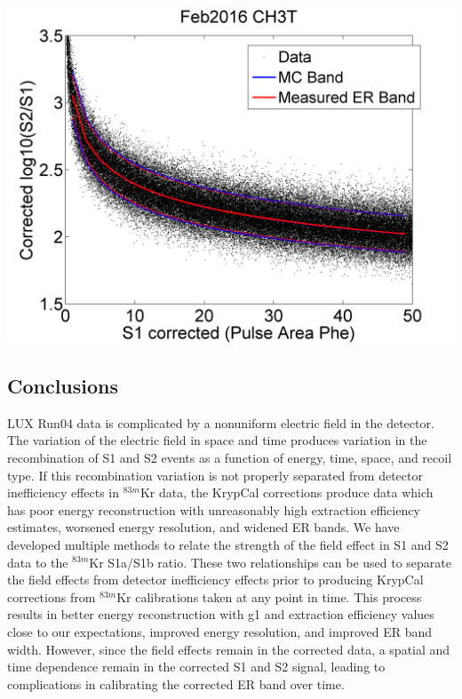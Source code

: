 \documentclass[a4paper,12pt]{article}
\begin{document}
{\begin{center}
\includegraphics[scale=0.45]{Run04Corrections/Feb2016_ERPrediction.png}
 \label{Feb2016ERPred}
\end{center}

\subsection{Conclusions}

LUX Run04 data is complicated by a nonuniform electric field in the detector.  The variation of the electric field in space and time produces variation in the recombination of S1 and S2 events as a function of energy, time, space, and recoil type.  If this recombination variation is not properly separated from detector inefficiency effects in $^{83m}$Kr data, the KrypCal corrections produce data which has poor energy reconstruction with unreasonably high extraction efficiency estimates, worsened energy resolution, and widened ER bands.  We have developed multiple methods to relate the strength of the field effect in S1 and S2 data to the $^{83m}$Kr S1a/S1b ratio.  These two relationships can be used to separate the field effects from detector inefficiency effects prior to producing KrypCal corrections from $^{83m}$Kr calibrations taken at any point in time.  This process results in better energy reconstruction with g1 and extraction efficiency values close to our expectations,  improved energy resolution, and improved ER band width.  However, since the field effects remain in the corrected data, a spatial and time dependence remain in the corrected S1 and S2 signal, leading to complications in calibrating the corrected ER band over time.

}
\end{document}
